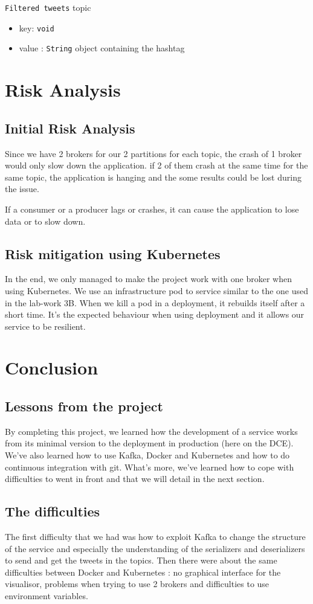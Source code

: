 \documentclass[10pt,a4paper]{article}
\begin{document}
\texttt{Filtered tweets} topic
\begin{itemize}
    \item key: \texttt{void}
    \item value : \texttt{String} object containing the hashtag
\end{itemize}

\section{Risk Analysis}
\subsection{Initial Risk Analysis}
\qquad Since we have 2 brokers for our 2 partitions for each topic, the crash of 1 broker would only slow down the application. if 2 of them crash at the same time for the same topic, the application is hanging and the some results could be lost during the issue.

If a consumer or a producer lags or crashes, it can cause the application to lose data or to slow down.
\subsection{Risk mitigation using Kubernetes}
\qquad In the end, we only managed to make the project work with one broker when using Kubernetes. We use an infrastructure pod to service similar to the one used in the lab-work 3B. When we kill a pod in a deployment, it rebuilds itself after a short time. It's the expected behaviour when using deployment and it allows our service to be resilient.

\section{Conclusion}
\subsection{Lessons from the project}
\qquad By completing this project, we learned how the development of a service works from its minimal version to the deployment in production (here on the DCE). We've also learned how to use Kafka, Docker and Kubernetes and how to do continuous integration with git. What's more, we've learned how to cope with difficulties to went in front and that we will detail in the next section.
\subsection{The difficulties}
\qquad The first difficulty that we had was how to exploit Kafka to change the structure of the service and especially the understanding of the serializers and deserializers to send and get the tweets in the topics. Then there were about the same difficulties between Docker and Kubernetes : no graphical interface for the visualisor, problems when trying to use 2 brokers and difficulties to use environment variables.
\end{document}
